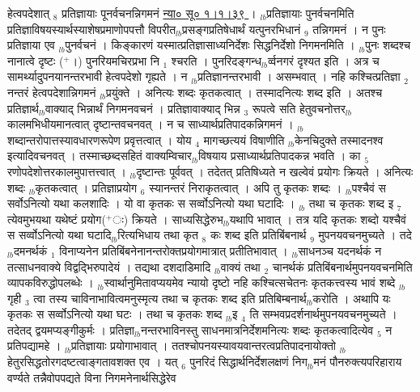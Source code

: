 \documentclass[article,12pt,a4paper]{memoir}%
\newcommand{\add}[1]{($^{+}$#1)}
\begin{document}
	  
	  \pstart \leavevmode%
	\hphantom{.}हेत्वपदेशात् {\tiny $_{8}$} प्रतिज्ञायाः पूनर्वचनन्निगमनं \href{http://sarit.indology.info/?cref=ns\%C5\%AB.1.1.39}{न्या० सू० १।१।३९ } । {\tiny $_{lb}$}प्रतिज्ञायाः पुनर्वचनमिति प्रतिज्ञाविषयस्यार्थस्याशेषप्रमाणोपपत्तौ विपरीत{\tiny $_{lb}$}प्रसङ्गप्रतिषेधार्थं यत्पुनरभिधानं {\tiny $_{9}$} \leavevmode{} तन्निगमनं । न पुनः प्रतिज्ञाया एव {\tiny $_{lb}$}पुनर्वचनं । किङ्कारणं यस्मात्प्रतिज्ञासाध्यनिर्देशः सिद्धनिर्देशो निगमनमिति । {\tiny $_{lb}$}पुनः शब्दश्च नानात्वे दृष्टः \add{।} पुनरियमचिरप्रभा नि {\tiny $_{1}$} श्चरति । पुनरिदङ्गन्ध{\tiny $_{lb}$}र्व्वनगरं दृश्यत इति । अत्र च सामर्थ्यादुपनयानन्तरभावी हेत्वपदेशो गृह्यते । न {\tiny $_{lb}$}प्रतिज्ञानन्तरभावी । असम्भवात् । नहि कश्चित्प्रतिज्ञा {\tiny $_{2}$} नन्तरं हेत्वपदेशान्निगमनं {\tiny $_{lb}$}प्रयुंक्ते । अनित्यः शब्दः कृतकत्वात् । तस्मादनित्यः शब्द इति । अतश्च प्रतिज्ञार्थ{\tiny $_{lb}$}वाक्याद् भिन्नार्थं निगमनवचनं । प्रतिज्ञावाक्याद् भिन्न {\tiny $_{3}$} रूपत्वे सति हेतुवचनोत्तर{\tiny $_{lb}$}कालमभिधीयमानत्वात् {\color{DodgerBlue3}दृष्टान्तवचनवत्} । न च साध्यार्थप्रतिपादकन्निगमनं । {\tiny $_{lb}$}शब्दान्तरोपात्तस्यावधारणरूपेण प्रवृत्तत्वात् । योय {\tiny $_{4}$} मागच्छत्ययं विषाणीति {\tiny $_{lb}$}केनचिदुक्ते तस्मादनश्व इत्यादिवचनवत् । तस्माच्छब्दसहितं वाक्यम्विचार{\tiny $_{lb}$}विषयाय प्रसाध्यार्थप्रतिपादकन्न भवति । का {\tiny $_{5}$} रणोपदेशोत्तरकालमुपात्तत्त्वात् । {\tiny $_{lb}$}दृष्टान्तः पूर्ववत् । तदेतत् प्रतिषिध्यते न खल्वेवं प्रयोगः क्रियते । अनित्यः शब्दः {\tiny $_{lb}$}कृतकत्वात् । प्रतिज्ञाप्रयोग {\tiny $_{6}$} स्यानन्तरं निराकृतत्वात् । अपि तु कृतकः शब्दः । {\tiny $_{lb}$}पश्चैवं स सर्वोऽनित्यो यथा कलशादिः । यो वा कृतकः स सर्व्वोऽनित्यो यथा घटादिः । {\tiny $_{lb}$} \leavevmode{} तथा च कृतकः शब्द इ {\tiny $_{7}$} त्येवमुभयथा यथेष्टं प्रयोग\add{ः} क्रियते । साध्यसिद्धेरुभ{\tiny $_{lb}$}यथापि भावात् । तत्र यदि कृतकः शब्दो यश्चैवं स सर्व्वोऽनित्यो यथा घटादि{\tiny $_{lb}$}रित्यभिधाय तथा कृत {\tiny $_{8}$} कः शब्द इति प्रतिबिंबनार्थ {\tiny $_{9}$} \leavevmode{} मुपनयवचनमुच्यते । तदे{\tiny $_{lb}$}दमनर्थकं {\tiny $_{1}$} विनाप्यनेन प्रतिबिंबनेनानन्तरोक्तप्रयोगमात्रात् प्रतीतिभावात् । {\tiny $_{lb}$}साधनञ्च यदनर्थकं न तत्साधनवाक्ये विद्वद्भिरुपादेयं । तद्यथा दशदाडिमादि {\tiny $_{lb}$}वाक्यं तथा {\tiny $_{2}$} चानर्थकं प्रतिबिंबनार्थमुपनयवचनमिति व्यापकविरुद्धोपलब्धेः । {\tiny $_{lb}$}स्वार्थानुमितावप्ययमेव न्यायो दृष्टो नहि कश्चित्सचेतनः कृतकत्त्वस्य भावं शब्दे {\tiny $_{lb}$}गृही {\tiny $_{3}$} त्वा तस्य चाविनाभावित्वमनुस्मृत्य तथा च कृतकः शब्द इति प्रतिबिम्बनार्थ{\tiny $_{lb}$}करोति । अथापि यः कृतकः स सर्व्वोऽनित्यो यथा घटः । तथा च कृतकः शब्द {\tiny $_{lb}$}इ {\tiny $_{4}$} ति सम्भवप्रदर्शनार्थमुपनयवचनमुच्यते । तदेतद् द्वयमप्यङ्गीकुर्मः । प्रतिज्ञा{\tiny $_{lb}$}नन्तरभाविनस्तु साधनमात्रनिर्देशमनित्यः शब्दः कृतकत्वादित्येव {\tiny $_{5}$} न प्रतिपद्यामहे । {\tiny $_{lb}$}प्रतिज्ञायाः प्रयोगाभावात् । ततश्चोपनयस्यावयवान्तरत्वप्रतिपादनायोक्तो {\tiny $_{lb}$}हेतुरसिद्धतोरगदष्टत्वाङ्गतावशक्त एव । यत् {\tiny $_{6}$} पुनरिदं सिद्धार्थनिर्देशलक्षणं निग{\tiny $_{lb}$}मनं पौनरुक्त्यपरिहाराय वर्ण्यते तन्नैवोपपद्यते विना निगमनेनार्थसिद्धेरेव 
\end{document}
